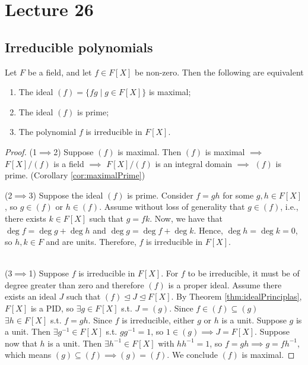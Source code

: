 \section{Lecture 26}
\subsection{Irreducible polynomials}
\begin{theorem}
  Let $F$ be a field, and let $f\in F[X]$ be non-zero. Then the following are equivalent
  \begin{enumerate}
    \item The ideal $(f)=\{fg \mid g\in F[X]\}$ is maximal;
    \item The ideal $(f)$ is prime;
    \item The polynomial $f$ is irreducible in $F[X]$.
  \end{enumerate}
  \label{<+label+>}
\end{theorem}
\begin{proof}
(1$\implies$2) Suppose $(f)$ is maximal. Then $(f)$ is maximal $\implies$ $F[X]/(f)$ is a field $\implies$ $F[X]/(f)$ is an integral domain $\implies$ $(f)$ is prime. (Corollary \ref{cor:maximalPrime})

(2$\implies$3) Suppose the ideal $(f)$ is prime. Consider $f = gh$ for some $g,h \in F[X]$, so $g \in (f)$ or $h \in (f)$. Assume without loss of generality that $g \in (f)$, i.e., there exists $k \in F[X]$ such that $g = fk$. Now, we have that $\deg f = \deg g + \deg h$ and $\deg g = \deg f + \deg k$. Hence, $\deg h = \deg k = 0$, so $h,k \in F$ and are units. Therefore, $f$ is irreducible in $F[X]$.    

\\(3$\implies$1) Suppose $f$ is irreducible in $F[X]$. For $f$ to be irreducible, it must be of degree greater than zero and therefore $(f)$ is a proper ideal. Assume there exists an ideal $J$ such that $(f) \unlhd J\unlhd F[X]$. By Theorem \ref{thm:idealPrinciplas}, $F[X]$ is a PID, so $\exists g \in F[X]$ s.t. $J = (g)$. Since $f \in (f) \subseteq (g)$ $\exists h \in F[X]$ s.t. $f = gh$. Since $f$ is irreducible, either $g$ or $h$ is a unit. Suppose $g$ is a unit. Then $\exists g^{-1} \in F[X]$ s.t. $gg^{-1} = 1$, so $1\in(g)\implies J = F[X]$. Suppose now that $h$ is a unit. Then $\exists h^{-1}\in F[X]$ with $hh^{-1}=1$, so $f=gh\implies g=fh^{-1}$, which means $(g)\subseteq(f)\implies(g)=(f)$. We conclude $(f)$ is maximal.
\end{proof}

